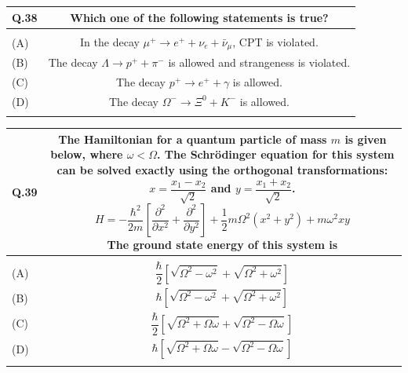 \documentclass[12pt,a4paper]{article}
\begin{document}
\vspace{0.4cm}

\begin{table}[h!]
\begin{tabular}{|L|C|}
\hline
Q.38 & Which one of the following statements is true? \\
\hline
 & \\
\hline
(A) & In the decay $\mu^+ \to e^+ + \nu_e + \bar{\nu}_\mu$, CPT is violated. \\
\hline
(B) & The decay $\Lambda \to p^+ + \pi^-$ is allowed and strangeness is violated. \\
\hline
(C) & The decay $p^+ \to e^+ + \gamma$ is allowed. \\
\hline
(D) & The decay $\Omega^- \to \Xi^0 + K^-$ is allowed. \\
\hline
 & \\
\hline
\end{tabular}
\end{table}

\vspace{0.4cm}

\begin{table}[h!]
\begin{tabular}{|L|C|}
\hline
Q.39 &
The Hamiltonian for a quantum particle of mass $m$ is given below, where $\omega < \Omega$.
The Schr\"{o}dinger equation for this system can be solved exactly using the orthogonal
transformations: $x = \dfrac{x_1 - x_2}{\sqrt{2}}$ and $y = \dfrac{x_1 + x_2}{\sqrt{2}}$.
\[
  H = -\frac{\hbar^2}{2m}\left[\frac{\partial^2}{\partial x^2}
      + \frac{\partial^2}{\partial y^2}\right]
      + \frac{1}{2}m\Omega^2(x^2 + y^2) + m\omega^2 xy
\]
The ground state energy of this system is \\
\hline
 & \\
\hline
(A) & $\dfrac{\hbar}{2}\!\left[\sqrt{\Omega^2 - \omega^2} + \sqrt{\Omega^2 + \omega^2}\right]$ \\
\hline
(B) & $\hbar\!\left[\sqrt{\Omega^2 - \omega^2} + \sqrt{\Omega^2 + \omega^2}\right]$ \\
\hline
(C) & $\dfrac{\hbar}{2}\!\left[\sqrt{\Omega^2 + \Omega\omega} + \sqrt{\Omega^2 - \Omega\omega}\right]$ \\
\hline
(D) & $\hbar\!\left[\sqrt{\Omega^2 + \Omega\omega} - \sqrt{\Omega^2 - \Omega\omega}\right]$ \\
\hline
 & \\
\hline
\end{tabular}
\end{table}
\end{document}
